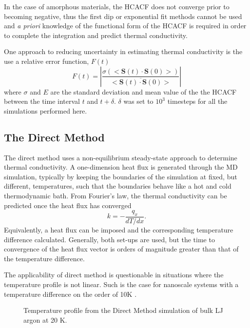In the case of amorphous materials, the HCACF does not converge prior to becoming negative, thus the first dip or exponential fit methods cannot be used and \textit{a priori} knowledge of the functional form of the HCACF is required in order to complete the integration and predict thermal conductivity.

One approach to reducing uncertainty in estimating thermal conductivity is the use a relative error function, $F(t)$ \cite{Chen20102392}
%
\begin{equation}\label{EQ:errfunc}
F(t)= \left\lvert\frac{\sigma(<\bm{S}(t)\cdot\bm{S}(0)>)}{\overline{<\bm{S}(t)\cdot\bm{S}(0)>}} \right\rvert
\end{equation}
%
where $\sigma$ and $E$ are the standard deviation and mean value of the the HCACF between the time interval $t$ and $t+\delta$. $\delta$ was set to $10^3$ timesteps for all the simulations performed here.

\subsection{The Direct Method}

The direct method uses a non-equilibrium steady-state approach to determine thermal conductivity. A one-dimension heat flux is generated through the MD simulation, typically by keeping the boundaries of the simulation at fixed, but different, temperatures, such that the boundaries behave like a hot and cold thermodynamic bath. From Fourier's law, the thermal conductivity can be predicted once the heat flux has converged
%
\begin{equation}\label{EQ:DM_k}
k=-\frac{q_x}{dT/dx}.
\end{equation}
%
Equivalently, a heat flux can be imposed and the corresponding temperature difference calculated. Generally, both set-ups are used, but the time to convergence of the heat flux vector is orders of magnitude greater than that of the temperature difference.

The applicability of direct method is questionable in situations where the temperature profile is not linear. Such is the case for nanoscale systems with a temperature difference on the order of 10K \cite{mcgaugheythesis}.
%
\begin{figure}
\begin{center}
\renewcommand{\figure}{Fig.}
\caption{Temperature profile from the Direct Method simulation of bulk LJ argon at 20 K.}
\label{FIG:GK_bulk}
\end{center}
\end{figure}
%
%

